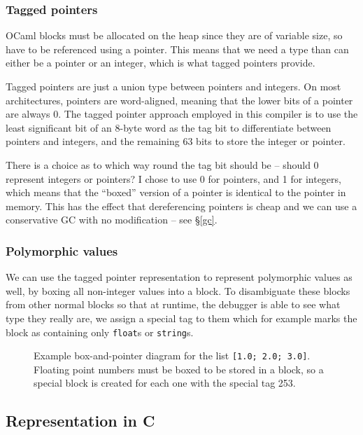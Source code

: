 \documentclass[12pt,a4paper,twoside,openright]{report}
\begin{document}
\subsubsection{Tagged pointers}

OCaml blocks must be allocated on the heap since they are of variable size, so
have to be referenced using a pointer. This means that we need a type than can
either be a pointer or an integer, which is what tagged pointers provide.

Tagged pointers are just a union type between pointers and integers. On most
architectures, pointers are word-aligned, meaning that the lower bits of a
pointer are always 0. The tagged pointer approach employed in this compiler is
to use the least significant bit of an 8-byte word as the tag bit to
differentiate between pointers and integers, and the remaining 63 bits to store
the integer or pointer.

There is a choice as to which way round the tag bit should be -- should 0 
represent integers or pointers? I chose to use 0 for pointers, and 1 for 
integers, which means that the ``boxed'' version of a pointer is identical to 
the pointer in memory. This has the effect that dereferencing pointers is cheap
and we can use a conservative GC with no modification -- see \S\ref{gc}.

\subsubsection{Polymorphic values}

We can use the tagged pointer representation to represent polymorphic values as
well, by boxing all non-integer values into a block. To disambiguate these
blocks from other normal blocks so that at runtime, the debugger is able to see
what type they really are, we assign a special tag to them which for example
marks the block as containing only \texttt{float}s or \texttt{string}s.

\begin{figure}
    \centering
    
    \caption{Example box-and-pointer diagram for the list \texttt{[1.0; 2.0;
        3.0]}. Floating point numbers must be boxed to be stored in a block, so
        a special block is created for each one with the special tag 253.}
    \label{fig:block-example}
\end{figure}

\subsection{Representation in C} \label{c-repr}
\end{document}
